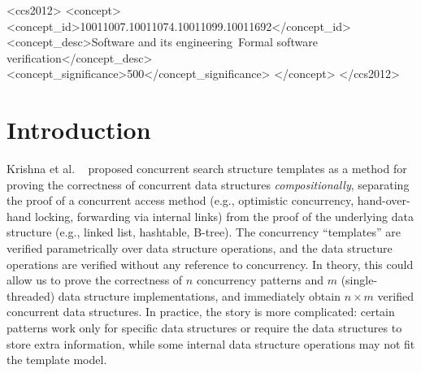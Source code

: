 \documentclass[sigplan,screen]{acmart}
\newcommand{\wm}[1]{\textbf{\textcolor{violet}{[William: #1]}}}
\begin{document}
\begin{CCSXML}
	<ccs2012>
	<concept>
	<concept_id>10011007.10011074.10011099.10011692</concept_id>
	<concept_desc>Software and its engineering~Formal software verification</concept_desc>
	<concept_significance>500</concept_significance>
	</concept>
	</ccs2012>
\end{CCSXML}



\maketitle

\section{Introduction}
\label{sec:introduction}
Krishna et al. ~\cite{templates} proposed concurrent search structure templates as a method for proving the correctness of concurrent data structures \emph{compositionally}, separating the proof of a concurrent access method (e.g., optimistic concurrency, hand-over-hand locking, forwarding via internal links) from the proof of the underlying data structure (e.g., linked list, hashtable, B-tree). The concurrency ``templates'' are verified parametrically over data structure operations, and the data structure operations are verified without any reference to concurrency. In theory, this could allow us to prove the correctness of $n$ concurrency patterns and $m$ (single-threaded) data structure implementations, and immediately obtain $n \times m$ verified concurrent data structures. In practice, the story is more complicated: certain patterns work only for specific data structures or require the data structures to store extra information, while some internal data structure operations may not fit the template model. %
\end{document}
